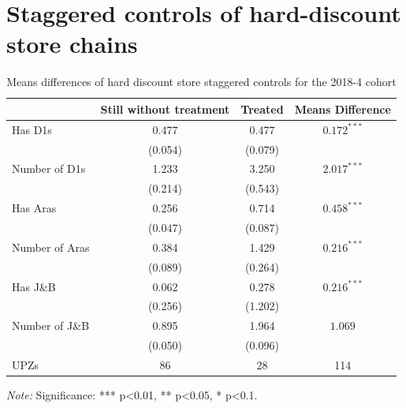 \documentclass[12pt]{article}
\begin{document}
\section{Staggered controls of hard-discount store chains}
\label{sec:controles_cadenas_descuento}

\begin{table} [H]
  \centering
  \caption{Means differences of hard discount store staggered controls for the 2018-4 cohort}
  \label{tab:staggered_controls_2018}
  \begin{tabular}{l c c c}
    \toprule
    & \textbf{Still without treatment} & \textbf{Treated} & \textbf{Means Difference} \\
    \midrule
    Has D1s & 0.477 & 0.477 & $0.172^{***}$ \\
    & (0.054) & (0.079) & \\
    \midrule
    Number of D1s & 1.233 & 3.250 & $2.017^{***}$ \\
    & (0.214) & (0.543) & \\
    \midrule
    Has Aras & 0.256 & 0.714 & $0.458^{***}$ \\
    & (0.047) & (0.087) & \\
    \midrule
    Number of Aras & 0.384 & 1.429 & $0.216^{***}$ \\
    & (0.089) & (0.264) & \\
    \midrule
    Has J\&B &  0.062& 0.278& $0.216^{***}$ \\
    & (0.256) & (1.202)& \\
    \midrule
    Number of J\&B & 0.895 & 1.964  &  $1.069$\\
    &  (0.050) & (0.096)  & \\
    \midrule
    UPZs & 86 & 28 & 114 \\
    \bottomrule
  \end{tabular}
  \parbox[t]{\textwidth}{%
    \vspace{0.5em}
    \footnotesize{ \textit{Note:} Significance: *** p<0.01, ** p<0.05, * p<0.1.}}
\end{table}
\end{document}
